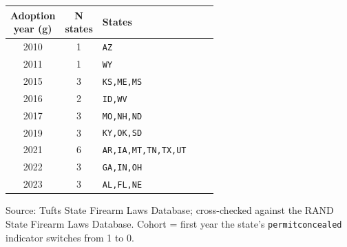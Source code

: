 \begin{threeparttable}
\caption{Permitless carry adoption cohorts, 1999--2023}
\label{tab:cohorts}
\begin{tabular}{ccp{0.6\linewidth}}
\toprule
Adoption year (g) & N states & States \\
\midrule
  2010 & 1 & \texttt{AZ} \\
  2011 & 1 & \texttt{WY} \\
  2015 & 3 & \texttt{KS,ME,MS} \\
  2016 & 2 & \texttt{ID,WV} \\
  2017 & 3 & \texttt{MO,NH,ND} \\
  2019 & 3 & \texttt{KY,OK,SD} \\
  2021 & 6 & \texttt{AR,IA,MT,TN,TX,UT} \\
  2022 & 3 & \texttt{GA,IN,OH} \\
  2023 & 3 & \texttt{AL,FL,NE} \\
\bottomrule
\end{tabular}
\begin{tablenotes}\footnotesize
\item Source: Tufts State Firearm Laws Database; cross-checked against the RAND State Firearm Laws Database. Cohort = first year the state's \texttt{permitconcealed} indicator switches from 1 to 0.
\end{tablenotes}
\end{threeparttable}
